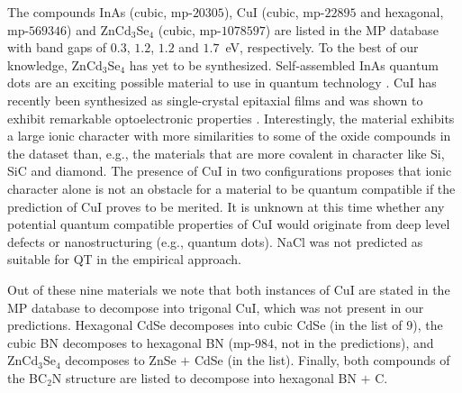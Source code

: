 \documentclass[superscriptaddress,unsortedaddress,
 amsmath,amssymb,
 aps,
]{revtex4-2}
\begin{document}
The compounds InAs (cubic, mp-$20305$), CuI (cubic, mp-$22895$ and hexagonal, mp-$569346$) and ZnCd$_3$Se$_4$ (cubic, mp-$1078597$) are listed in the MP database with band gaps of $0.3$, $1.2$, $1.2$ and $1.7$~eV, respectively. 
To the best of our knowledge, ZnCd$_3$Se$_4$ has yet to be synthesized. 
Self-assembled InAs quantum dots are an exciting possible material to use in quantum technology \cite{Liu2018}. 
CuI has recently been synthesized as single-crystal epitaxial films and was shown to exhibit remarkable optoelectronic properties \cite{Ahn2020}. Interestingly, the material exhibits a large ionic character with more similarities to some of the oxide compounds in the dataset than, e.g., the materials that are more covalent in character like Si, SiC and  diamond.  
The presence of CuI in two configurations  proposes that ionic character alone is not an obstacle for a material to be quantum compatible if the prediction of CuI proves to be merited. It is unknown at this time whether any potential quantum compatible properties of CuI would originate from deep level defects or  nanostructuring (e.g., quantum dots). NaCl was not predicted as suitable for QT in the empirical approach.  

Out of these nine materials we note that both instances of CuI are stated in the MP database to decompose into trigonal CuI, which was not present in our predictions. Hexagonal CdSe decomposes into cubic CdSe (in the list of $9$), the cubic BN decomposes to hexagonal BN (mp-$984$, not in the predictions), and ZnCd$_3$Se$_4$ decomposes to ZnSe $+$ CdSe (in the list). Finally, both compounds of the BC$_2$N structure are listed to decompose into hexagonal BN $+$ C. 
\end{document}
